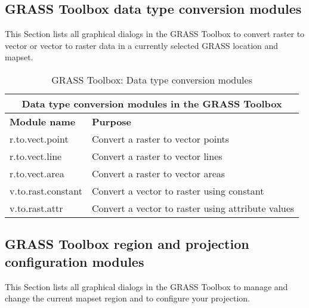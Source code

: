 \newpage

\subsection{GRASS Toolbox data type conversion modules}

This Section lists all graphical dialogs in the GRASS Toolbox to convert
raster to vector or vector to raster data in a currently selected GRASS location 
and mapset.

\begin{table}[ht]
\centering
\caption{GRASS Toolbox: Data type conversion modules}\medskip
 \begin{tabular}{|p{4cm}|p{12cm}|}
  \hline \multicolumn{2}{|c|}{\textbf{Data type conversion modules in the GRASS
  Toolbox}} \\
  \hline \textbf{Module name} & \textbf{Purpose} \\
  \hline r.to.vect.point & Convert a raster to vector points \\
  \hline r.to.vect.line & Convert a raster to vector lines \\
  \hline r.to.vect.area & Convert a raster to vector areas \\
  \hline v.to.rast.constant & Convert a vector to raster using constant \\
  \hline v.to.rast.attr & Convert a vector to raster using attribute values \\
\hline
\end{tabular}
\end{table}

\newpage

\subsection{GRASS Toolbox region and projection configuration modules}

This Section lists all graphical dialogs in the GRASS Toolbox to manage and
change the current mapset region and to configure your projection.

